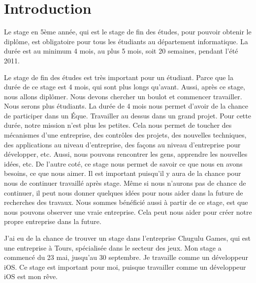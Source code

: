 \chapter{Introduction} %

Le stage en 5ème année, qui est le stage de fin des études, pour pouvoir obtenir le diplôme, est obligatoire pour tous les étudiants au département informatique. La durée est au minimum 4 mois, au plus 5 mois, soit 20 semaines, pendant l’été 2011. 

Le stage de fin des études est très important pour un étudiant. Parce que la durée de ce stage est 4 mois, qui sont plus longs qu'avant. Aussi, après ce stage, nous allons diplômer. Nous devons chercher un boulot et commencer travailler. Nous serons plus étudiants. La durée de 4 mois nous permet d'avoir de la chance de participer dans un Éque. Travailler au dessus dans un grand projet. Pour cette durée, notre mission n’est plus les petites. Cela nous permet de toucher des mécanismes d'une entreprise, des contrôles des projets, des nouvelles techniques, des applications au niveau d'entreprise, des façons au niveau d'entreprise pour développer, etc. Aussi, nous pouvons rencontrer les gens, apprendre les nouvelles idées, etc. De l'autre coté, ce stage nous permet de savoir ce que nous en avons besoins, ce que nous aimer. Il est important puisqu’il y aura de la chance pour nous de continuer travaillé après stage. Même si nous n'aurons pas de chance de continuer, il peut nous donner quelques idées pour nous aider dans la future de recherches des travaux. Nous sommes bénéficié aussi à partir de ce stage, est que nous pouvons observer une vraie entreprise. Cela peut nous aider pour créer notre propre entreprise dans la future.

J’ai eu de la chance de trouver un stage dans l’entreprise Chugulu Games, qui est une entreprise à Tours, spécialisée dans le secteur des jeux. Mon stage a commencé du 23 mai, jusqu'au 30 septembre. Je travaille comme un développeur iOS. Ce stage est important pour moi, puisque travailler comme un développeur iOS est mon rêve. 

